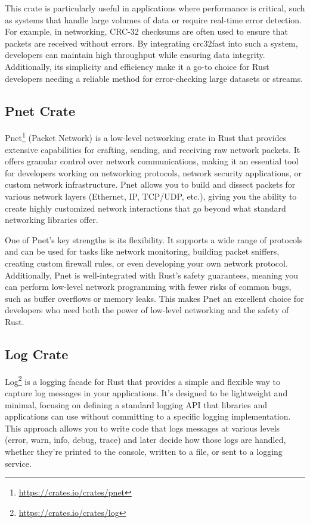 This crate is particularly useful in applications where performance is critical, such as systems that handle large volumes of data or require real-time error detection. For example, in networking, CRC-32 checksums are often used to ensure that packets are received without errors. By integrating crc32fast into such a system, developers can maintain high throughput while ensuring data integrity. Additionally, its simplicity and efficiency make it a go-to choice for Rust developers needing a reliable method for error-checking large datasets or streams.

\subsection{Pnet Crate}

Pnet\footnote{\url{https://crates.io/crates/pnet}} (Packet Network) is a low-level networking crate in Rust that provides extensive capabilities for crafting, sending, and receiving raw network packets. It offers granular control over network communications, making it an essential tool for developers working on networking protocols, network security applications, or custom network infrastructure. Pnet allows you to build and dissect packets for various network layers (Ethernet, IP, TCP/UDP, etc.), giving you the ability to create highly customized network interactions that go beyond what standard networking libraries offer.

One of Pnet's key strengths is its flexibility. It supports a wide range of protocols and can be used for tasks like network monitoring, building packet sniffers, creating custom firewall rules, or even developing your own network protocol. Additionally, Pnet is well-integrated with Rust’s safety guarantees, meaning you can perform low-level network programming with fewer risks of common bugs, such as buffer overflows or memory leaks. This makes Pnet an excellent choice for developers who need both the power of low-level networking and the safety of Rust.

\subsection{Log Crate}

Log\footnote{\url{https://crates.io/crates/log}} is a logging facade for Rust that provides a simple and flexible way to capture log messages in your applications. It’s designed to be lightweight and minimal, focusing on defining a standard logging API that libraries and applications can use without committing to a specific logging implementation. This approach allows you to write code that logs messages at various levels (error, warn, info, debug, trace) and later decide how those logs are handled, whether they're printed to the console, written to a file, or sent to a logging service.

